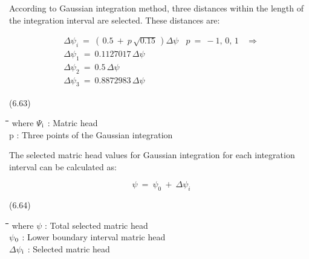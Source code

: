 \documentclass[11pt]{article}
\begin{document}
\bigskip
\bigskip
According to Gaussian integration method, three distances within the length of the
integration interval are selected. These distances are:

\begin{eqnarray*}
\Delta \psi _{i} ~=~ (\, 0.5 ~+~ p\, \sqrt{0.15} \, )\Delta \psi ~~~~ p~=~ -1,\, 0,\, 1~~~~ \Rightarrow   \nonumber  \\
\Delta \psi _{1} ~=~ 0.1127017\,\Delta \psi \nonumber  \\
\Delta \psi _{2} ~=~ 0.5\,\Delta \psi \nonumber  \\
\Delta \psi _{3} ~=~ 0.8872983\,\Delta \psi
\end{eqnarray*}

 \bigskip
\strut\hfill (6.63)

\bigskip
\bigskip
\bigskip
\nwln
\begin{tabbing}
\hspace{1.27cm}\=\hspace{1.27cm}\=\hspace{1.27cm}\=\hspace{1.27cm}\=%
\hspace{1.27cm}\=\hspace{1.27cm}\=\hspace{1.27cm}\=\hspace{1.27cm}\=%
\hspace{1.27cm}\=\hspace{1.27cm}\=\kill
where\> $\Psi$$_{{\rm i}}$\> : Matric head\> \> \> \> \> \> \> \> [cm]\\
\>p\> : Three points of the Gaussian integration
\end{tabbing}

\bigskip
\bigskip
The selected matric head values for Gaussian integration for each integration interval can
be calculated as:

\begin{displaymath}
\psi ~=~ \psi _{0} ~+~\Delta \psi _{i} 
\end{displaymath}

 \bigskip
\strut\hfill (6.64)
\nwln
\begin{tabbing}
\hspace{1.27cm}\=\hspace{1.27cm}\=\hspace{1.27cm}\=\hspace{1.27cm}\=%
\hspace{1.27cm}\=\hspace{1.27cm}\=\hspace{1.27cm}\=\hspace{1.27cm}\=%
\hspace{1.27cm}\=\hspace{1.27cm}\=\kill
where\> $\psi$\> : Total selected matric head\> \> \> \> \> \> \> \> [cm]\\
\>$\psi$$_{{\rm 0}}$\> : Lower boundary interval matric head\> \> \> \> \> \> \> \> [cm]\\
\>$\Delta$$\psi$$_{{\rm i}}$\> : Selected matric head\> \> \> \> \> \> \> \> [cm]
\end{tabbing}
\end{document}

